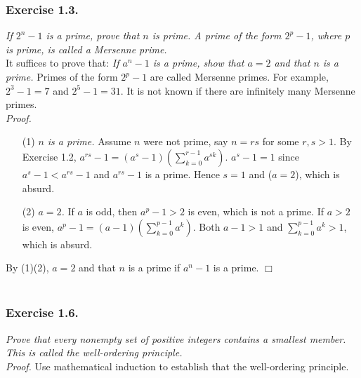 \documentclass{article}
\begin{document}


\subsubsection*{Exercise 1.3.}
\emph{If $2^n - 1$ is a prime, prove that $n$ is prime.
A prime of the form $2^p - 1$, where $p$ is prime, is called a Mersenne prime.} \\

It suffices to prove that:
\emph{If $a^n - 1$ is a prime, show that $a = 2$ and that $n$ is a prime.}
Primes of the form $2^p - 1$ are called Mersenne primes.
For example, $2^3 - 1 = 7$ and $2^5 - 1 = 31$.
It is not known if there are infinitely many Mersenne primes. \\

\emph{Proof.}
\begin{enumerate}
\item[(1)]
\emph{$n$ is a prime.}
Assume $n$ were not prime, say $n = rs$ for some $r, s > 1$.
By Exercise 1.2,
$a^{rs} - 1 = (a^s - 1)(\sum_{k=0}^{r-1} a^{sk})$.
$a^s - 1 = 1$ since $a^s - 1 < a^{rs} - 1$ and $a^{rs} - 1$ is a prime.
Hence $s=1$ and ($a=2$), which is absurd.
\item[(2)]
\emph{$a = 2$.}
If $a$ is odd, then $a^p - 1 > 2$ is even, which is not a prime.
If $a > 2$ is even,
$a^p - 1 = (a - 1)(\sum_{k=0}^{p-1} a^k)$.
Both $a - 1 > 1$ and $\sum_{k=0}^{p-1} a^k > 1$, which is absurd.
\end{enumerate}
By (1)(2), $a = 2$ and that $n$ is a prime if $a^n - 1$ is a prime.
$\Box$ \\\\






\subsubsection*{Exercise 1.6.}
\emph{Prove that every nonempty set of positive integers contains a smallest member.
This is called the well-ordering principle.} \\

\emph{Proof.}
Use mathematical induction to establish
that the well-ordering principle.
\end{document}
